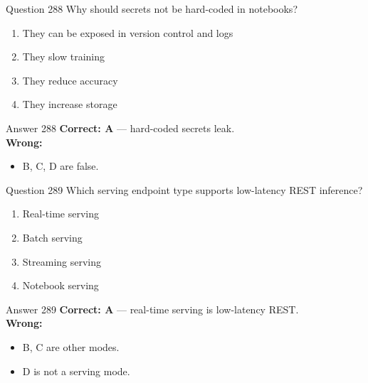 \documentclass[aspectratio=169,11pt]{beamer}
\begin{document}
	\begin{frame}{Question 288}
		Why should secrets not be hard-coded in notebooks?
		\begin{enumerate}[label=\Alph*.]
			\item They can be exposed in version control and logs
			\item They slow training
			\item They reduce accuracy
			\item They increase storage
		\end{enumerate}
	\end{frame}
	\begin{frame}{Answer 288}
		\textbf{Correct: A} --- hard-coded secrets leak.\\
		\vspace{0.5em}
		\textbf{Wrong:}
		\begin{itemize}
			\item B, C, D are false.
		\end{itemize}
	\end{frame}
	
	\begin{frame}{Question 289}
		Which serving endpoint type supports low-latency REST inference?
		\begin{enumerate}[label=\Alph*.]
			\item Real-time serving
			\item Batch serving
			\item Streaming serving
			\item Notebook serving
		\end{enumerate}
	\end{frame}
	\begin{frame}{Answer 289}
		\textbf{Correct: A} --- real-time serving is low-latency REST.\\
		\vspace{0.5em}
		\textbf{Wrong:}
		\begin{itemize}
			\item B, C are other modes.
			\item D is not a serving mode.
		\end{itemize}
	\end{frame}
	
\end{document}
